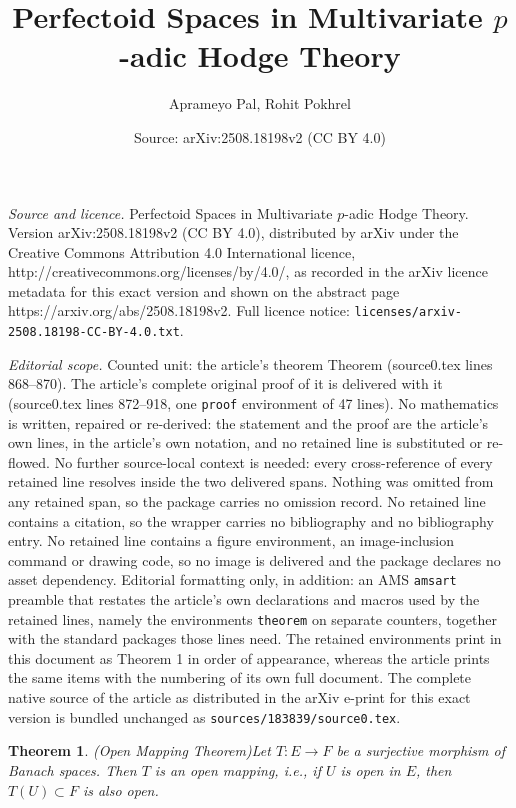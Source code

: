 \documentclass[10pt,a4paper]{amsart}
\title{Perfectoid Spaces in Multivariate $p$-adic Hodge Theory}
\author{Aprameyo Pal, Rohit Pokhrel}
\date{Source: arXiv:2508.18198v2 (CC BY 4.0)}
\newtheorem{theorem}{Theorem}
\begin{document}
\maketitle

\noindent\emph{Source and licence.} Perfectoid Spaces in Multivariate $p$-adic Hodge Theory. Version arXiv:2508.18198v2 (CC BY 4.0), distributed by arXiv under the Creative Commons Attribution 4.0 International licence, http://creativecommons.org/licenses/by/4.0/, as recorded in the arXiv licence metadata for this exact version and shown on the abstract page https://arxiv.org/abs/2508.18198v2. Full licence notice: \texttt{licenses/arxiv-2508.18198-CC-BY-4.0.txt}.\par\smallskip

\noindent\textit{Editorial scope.} Counted unit: the article's theorem Theorem (source0.tex lines 868--870). The article's complete original proof of it is delivered with it (source0.tex lines 872--918, one \texttt{proof} environment of 47 lines). No mathematics is written, repaired or re-derived: the statement and the proof are the article's own lines, in the article's own notation, and no retained line is substituted or re-flowed.  No further source-local context is needed: every cross-reference of every retained line resolves inside the two delivered spans.  Nothing was omitted from any retained span, so the package carries no omission record.  No retained line contains a citation, so the wrapper carries no bibliography and no bibliography entry.  No retained line contains a figure environment, an image-inclusion command or drawing code, so no image is delivered and the package declares no asset dependency.  Editorial formatting only, in addition: an AMS \texttt{amsart} preamble that restates the article's own declarations and macros used by the retained lines, namely the environments \texttt{theorem} on separate counters, together with the standard packages those lines need.  The retained environments print in this document as Theorem 1 in order of appearance, whereas the article prints the same items with the numbering of its own full document.  The complete native source of the article as distributed in the arXiv e-print for this exact version is bundled unchanged as \texttt{sources/183839/source0.tex}.
\begin{theorem}{\emph{(Open Mapping Theorem)}}\label{Open Mapping Theorem}
	Let $T:E\to F$ be a surjective morphism of Banach spaces. Then $T$ is an open mapping, i.e., if $U$ is open in $E$, then $T(U)\subset F$ is also open.
\end{theorem}
\end{document}
